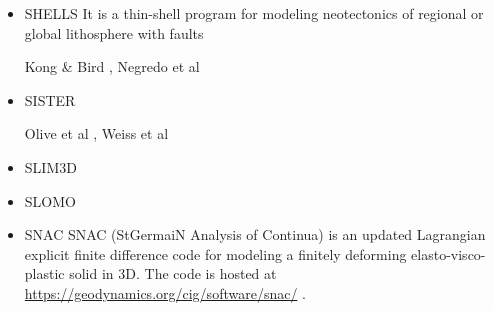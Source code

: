 \begin{itemize}
\item {\codefont SHELLS} 
It is a thin-shell program for modeling neotectonics of
regional or global lithosphere with faults

\begin{scriptsize}
Kong \& Bird \cite{kobi95}, Negredo et al \cite{nebs02}
\end{scriptsize}

\item {\codefont SISTER} 

\begin{scriptsize}
Olive et al \cite{olbm16}, Weiss et al \cite{weib18}
\end{scriptsize}

\item {\codefont SLIM3D} 

{\small
\noindent
\cite{poso08}
\cite{qusp10}
\cite{brps12}
\cite{brps13}
\cite{brau13}
\cite{brun14}
\cite{hebr14}
\cite{kobf14}
\cite{clbq15}
\cite{brcr17}
\cite{basq18}\cite{osss18}\cite{osss18b}
}

\item {\codefont SLOMO} 

{\small
\noindent
\cite{kaus05}
\cite{kasb08}
}

\item {\codefont SNAC} 
SNAC (StGermaiN Analysis of Continua) is an updated Lagrangian explicit finite 
difference code for modeling a finitely deforming elasto-visco-plastic solid in 3D.
The code is hosted at \url{https://geodynamics.org/cig/software/snac/} .

{\small
\noindent
\cite{chlg08}
\cite{chgu08}
\cite{qula10}
\cite{chss11}
}


\end{itemize}
